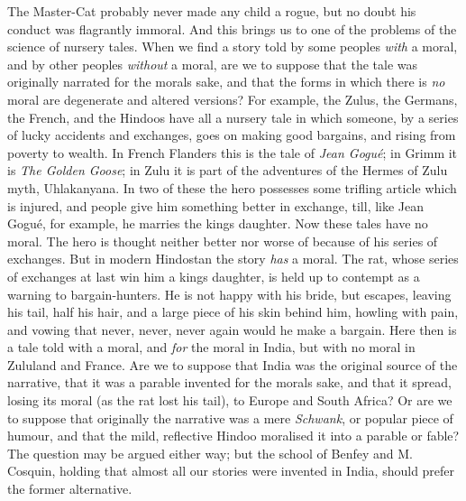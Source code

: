 \documentclass[14pt,a4paper]{memoir}
\begin{document}
{The Master-Cat probably never made any child a rogue, but no doubt his
conduct was flagrantly immoral. And this brings us to one of the
problems of the science of nursery tales. When we find a story told by
some peoples \emph{with} a moral, and by other peoples \emph{without} a
moral, are we to suppose that the tale was originally narrated for the
moral\textquotesingle s sake, and that the forms in which there is
\emph{no} moral are degenerate and altered versions? For example, the
Zulus, the Germans, the French, and the Hindoos have all a nursery tale
in which someone, by a series of lucky accidents and exchanges, goes on
making good bargains, and rising from poverty to wealth. In French
Flanders this is the tale of \emph{Jean Gogué}; in Grimm it is \emph{The
Golden Goose}; in Zulu it is part of the adventures of the Hermes of
Zulu myth, Uhlakanyana. In two of these the hero possesses some trifling
article which is injured, and people give him something better in
exchange, till, like Jean Gogué, for example, he marries the
king\textquotesingle s
daughter.
Now these tales have no moral. The hero is thought neither better nor
worse of because of his series of exchanges. But in modern Hindostan the
story \emph{has} a moral. The rat, whose series of exchanges at last win
him a king\textquotesingle s daughter, is held up to contempt as a
warning to bargain-hunters. He is not happy with his bride, but escapes,
leaving his tail, half his hair, and a large piece of his skin behind
him, howling with pain, and vowing that \textquotesingle never, never,
never again would he make a
bargain.\textquotesingle{}
Here then is a tale told with a moral, and \emph{for} the moral in
India, but with no moral in Zululand and France. Are we to suppose that
India was the original source of the narrative, that it was a parable
invented for the moral\textquotesingle s sake, and that it spread,
losing its moral (as the rat lost his tail), to Europe and South Africa?
Or are we to suppose that originally the narrative was a mere
\emph{Schwank}, or popular piece of humour, and that the mild,
reflective Hindoo moralised it into a parable or fable? The question may
be argued either way; but the school of Benfey and M. Cosquin, holding
that almost all our stories were invented in India, should prefer the
former alternative.

}
\end{document}
